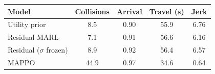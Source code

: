 \begin{tabular}{lcccc}
\toprule
Model & Collisions & Arrival & Travel (s) & Jerk \\
\midrule
Utility prior & 8.5 & 0.90 & 55.9 & 6.76 \\
Residual MARL & 7.1 & 0.91 & 56.6 & 6.16 \\
Residual ($\sigma$ frozen) & 8.9 & 0.92 & 56.4 & 6.57 \\
MAPPO & 44.9 & 0.97 & 34.6 & 0.64 \\
\bottomrule
\end{tabular}
